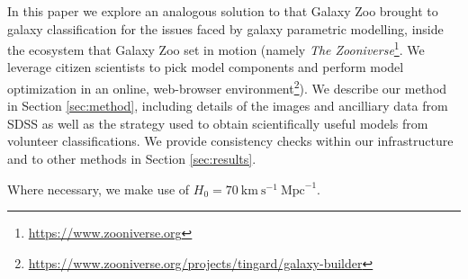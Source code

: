 \documentclass[../main.tex]{subfiles}
\begin{document}
In this paper we explore an analogous solution to that Galaxy Zoo brought to galaxy classification \citep{Lintott2008:0804.4483v1} for the issues faced by galaxy parametric modelling, inside the ecosystem that Galaxy Zoo set in motion (namely {\it The Zooniverse}\footnote{\url{https://www.zooniverse.org}}. We leverage citizen scientists to pick model components and perform model optimization in an online, web-browser environment\footnote{\url{https://www.zooniverse.org/projects/tingard/galaxy-builder}}). We describe our method in Section \ref{sec:method}, including details of the images and ancilliary data from SDSS as well as the strategy used to obtain scientifically useful models from volunteer classifications. We provide consistency checks within our infrastructure and to other methods in Section \ref{sec:results}.

Where necessary, we make use of $H_0 = 70\ \text{km}\ \text{s}^{-1}\ \text{Mpc}^{-1}$.
\end{document}
